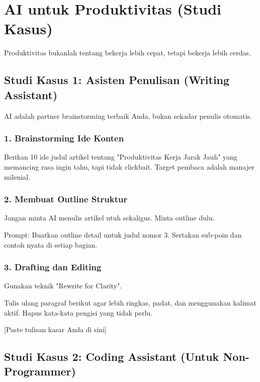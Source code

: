 \chapter{AI untuk Produktivitas (Studi Kasus)}
\label{chap:productivity}

Produktivitas bukanlah tentang bekerja lebih cepat, tetapi bekerja lebih cerdas.

\section{Studi Kasus 1: Asisten Penulisan (Writing Assistant)}

AI adalah partner brainstorming terbaik Anda, bukan sekadar penulis otomatis.

\subsection{1. Brainstorming Ide Konten}

\begin{promptbox}[title=Prompt Kreatif]
Berikan 10 ide judul artikel tentang "Produktivitas Kerja Jarak Jauh" yang memancing rasa ingin tahu, tapi tidak clickbait. Target pembaca adalah manajer milenial.
\end{promptbox}

\subsection{2. Membuat Outline Struktur}

Jangan minta AI menulis artikel utuh sekaligus. Minta outline dulu.
\begin{codeblock}
Prompt: Buatkan outline detail untuk judul nomor 3. Sertakan sub-poin dan contoh nyata di setiap bagian.
\end{codeblock}

\subsection{3. Drafting dan Editing}

Gunakan teknik "Rewrite for Clarity".
\begin{promptbox}[title=Editing Prompt]
Tulis ulang paragraf berikut agar lebih ringkas, padat, dan menggunakan kalimat aktif. Hapus kata-kata pengisi yang tidak perlu.

[Paste tulisan kasar Anda di sini]
\end{promptbox}

\section{Studi Kasus 2: Coding Assistant (Untuk Non-Programmer)}

